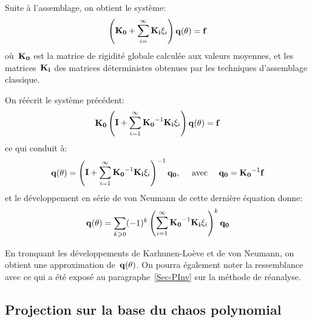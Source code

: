 Suite à l'assemblage, on obtient le système:
\begin{equation}\label{Eq-StoKLEx}
\PP{\MM{K_0}+\dsum_{i=}^\infty\MM{K_i}\xi_i}\VV{q(\theta)}=\VV{f}
\end{equation}
où~$\MM{K_0}$ est la matrice de rigidité globale calculée aux valeurs moyennes, et les matrices~$\MM{K_i}$ des matrices déterministes obtenues par les techniques d'assemblage classique.

On réécrit le système précédent:
\begin{equation}
\MM{K_0}\PP{\MM{I}+\dsum_{i=1}^\infty\MMI{K_0}\MM{K_i}\xi_i}\VV{q(\theta)}=\VV{f}
\end{equation}
ce qui conduit à:
\begin{equation}
\VV{q(\theta)} = \PP{\MM{I}+\dsum_{i=1}^\infty\MMI{K_0}\MM{K_i}\xi_i}^{-1}\VV{q_0}, \quad \text{ avec } \quad \VV{q_0}=\MMI{K_0}\VV{f}
\end{equation}
et le développement en série de von Neumann de cette dernière équation donne:
\begin{equation}\label{Eq-StoQ}
\VV{q(\theta)} = \dsum_{k\ge0} (-1)^k \PP{\dsum_{i=1}^\infty\MMI{K_0}\MM{K_i}\xi_i}^k\VV{q_0}
\end{equation}

En tronquant les développements de Karhunen-Loève et de von Neumann, on obtient une approximation de~$\VV{q(\theta)}$. On pourra également noter la ressemblance avec ce qui a été exposé au paragraphe~\ref{Sec-PInv} sur la méthode de réanalyse.

\medskip
\subsection{Projection sur la base du chaos polynomial}

